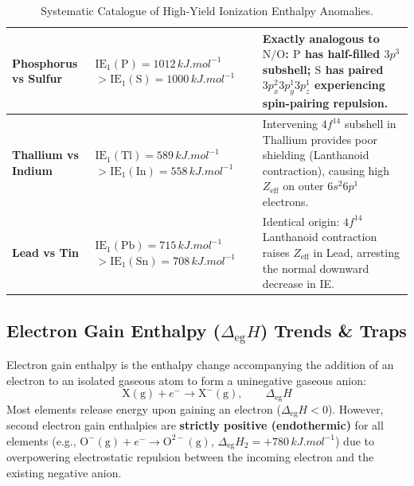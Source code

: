 \documentclass[10pt,a4paper]{article}
\begin{document}
\begin{table}[htbp]
\begin{tabularx}{\textwidth}{p{3.2cm} p{4.2cm} p{8.8cm}}
\midrule
\textbf{Phosphorus vs Sulfur} & $\text{IE}_1(\mathrm{P}) = 1012\,\si{kJ.mol^{-1}}$ \newline $> \text{IE}_1(\mathrm{S}) = 1000\,\si{kJ.mol^{-1}}$ & Exactly analogous to $\mathrm{N/O}$: $\mathrm{P}$ has half-filled $3p^3$ subshell; $\mathrm{S}$ has paired $3p_x^2 3p_y^1 3p_z^1$ experiencing spin-pairing repulsion. \\
\midrule
\textbf{Thallium vs Indium} & $\text{IE}_1(\mathrm{Tl}) = 589\,\si{kJ.mol^{-1}}$ \newline $> \text{IE}_1(\mathrm{In}) = 558\,\si{kJ.mol^{-1}}$ & Intervening $4f^{14}$ subshell in Thallium provides poor shielding (Lanthanoid contraction), causing high $Z_{\text{eff}}$ on outer $6s^2 6p^1$ electrons. \\
\midrule
\textbf{Lead vs Tin} & $\text{IE}_1(\mathrm{Pb}) = 715\,\si{kJ.mol^{-1}}$ \newline $> \text{IE}_1(\mathrm{Sn}) = 708\,\si{kJ.mol^{-1}}$ & Identical origin: $4f^{14}$ Lanthanoid contraction raises $Z_{\text{eff}}$ in Lead, arresting the normal downward decrease in IE. \\
\bottomrule
\end{tabularx}
\caption{Systematic Catalogue of High-Yield Ionization Enthalpy Anomalies.}
\end{table}

\subsection{Electron Gain Enthalpy ($\Delta_{\text{eg}} H$) Trends \& Traps}
Electron gain enthalpy is the enthalpy change accompanying the addition of an electron to an isolated gaseous atom to form a uninegative gaseous anion:
\begin{equation}
  \mathrm{X(g)} + e^- \longrightarrow \mathrm{X^-(g)}, \qquad \Delta_{\text{eg}} H
\end{equation}
Most elements release energy upon gaining an electron ($\Delta_{\text{eg}} H < 0$). However, second electron gain enthalpies are \textbf{strictly positive (endothermic)} for all elements (e.g., $\mathrm{O^-(g)} + e^- \to \mathrm{O^{2-}(g)}$, $\Delta_{\text{eg}} H_2 = +780\,\si{kJ.mol^{-1}}$) due to overpowering electrostatic repulsion between the incoming electron and the existing negative anion.
\end{document}
